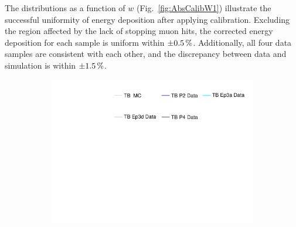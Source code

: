 The distributions as a function of $w$ (Fig.~\ref{fig:AbsCalibW1}) illustrate the successful uniformity of energy deposition after applying calibration. Excluding the region affected by the lack of stopping muon hits, the corrected energy deposition for each sample is uniform within $\pm\unit[0.5]{\%}$. Additionally, all four data samples are consistent with each other, and the discrepancy between data and simulation is within $\pm\unit[1.5]{\%}$.

\begin{figure}[!ht]
  \begin{subfigure}{\textwidth}
  \centering
    \includegraphics[height=0.2\linewidth]{Plots/Calibana/legend.pdf}
  \end{subfigure}
  \vspace*{2mm}
  

\end{figure}
